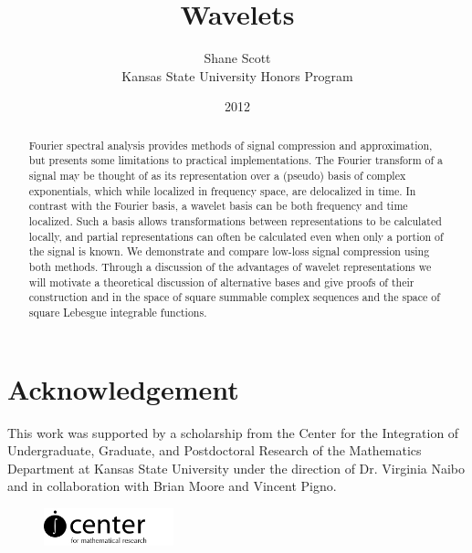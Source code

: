 \documentclass{report}
\title{Wavelets}
\author{Shane Scott \\ \small{Kansas State University Honors Program}}
\date{2012}
\begin{document}
\maketitle

\begin{abstract}
Fourier spectral analysis provides methods of signal compression and approximation, but presents some limitations to practical implementations. The Fourier transform of a signal may be thought of as its representation over a (pseudo) basis of complex exponentials, which while localized in frequency space, are delocalized in time. In contrast with the Fourier basis, a wavelet basis can be both frequency and time localized. Such a basis allows transformations between representations to be calculated locally, and partial representations can often be calculated even when only a portion of the signal is known.   We demonstrate and compare low-loss signal compression using both methods. Through a discussion of the advantages of wavelet representations we will motivate a theoretical discussion of alternative bases and give proofs of their construction and in the space of square summable complex sequences and the space of square Lebesgue integrable functions.
\end{abstract}

\tableofcontents
\listoffigures


\section*{Acknowledgement}

This work was supported by a scholarship from the Center for the Integration of Undergraduate, Graduate, and Postdoctoral Research of the Mathematics Department at Kansas State University under the direction of Dr. Virginia Naibo and in collaboration with Brian Moore and Vincent Pigno.

\begin{center}
\begin{figure}[!hf]
\center
\includegraphics[height=1.1cm]{icenterlogo2}
\end{figure}
\end{center}
\end{document}
